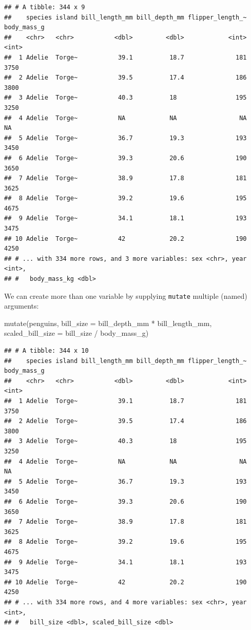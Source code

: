 \documentclass[
]{book}
\newenvironment{Shaded}{\begin{snugshade}}{\end{snugshade}}
\newcommand{\AttributeTok}[1]{\textcolor[rgb]{0.77,0.63,0.00}{#1}}
\newcommand{\FunctionTok}[1]{\textcolor[rgb]{0.00,0.00,0.00}{#1}}
\newcommand{\NormalTok}[1]{#1}
\newcommand{\SpecialCharTok}[1]{\textcolor[rgb]{0.00,0.00,0.00}{#1}}
\begin{document}
\begin{verbatim}
## # A tibble: 344 x 9
##    species island bill_length_mm bill_depth_mm flipper_length_~ body_mass_g
##    <chr>   <chr>           <dbl>         <dbl>            <int>       <int>
##  1 Adelie  Torge~           39.1          18.7              181        3750
##  2 Adelie  Torge~           39.5          17.4              186        3800
##  3 Adelie  Torge~           40.3          18                195        3250
##  4 Adelie  Torge~           NA            NA                 NA          NA
##  5 Adelie  Torge~           36.7          19.3              193        3450
##  6 Adelie  Torge~           39.3          20.6              190        3650
##  7 Adelie  Torge~           38.9          17.8              181        3625
##  8 Adelie  Torge~           39.2          19.6              195        4675
##  9 Adelie  Torge~           34.1          18.1              193        3475
## 10 Adelie  Torge~           42            20.2              190        4250
## # ... with 334 more rows, and 3 more variables: sex <chr>, year <int>,
## #   body_mass_kg <dbl>
\end{verbatim}

We can create more than one variable by supplying \texttt{mutate} multiple (named) arguments:

\begin{Shaded}
\begin{Highlighting}[]
\FunctionTok{mutate}\NormalTok{(penguins, }
       \AttributeTok{bill\_size =}\NormalTok{ bill\_depth\_mm }\SpecialCharTok{*}\NormalTok{ bill\_length\_mm,}
       \AttributeTok{scaled\_bill\_size =}\NormalTok{ bill\_size }\SpecialCharTok{/}\NormalTok{ body\_mass\_g)}
\end{Highlighting}
\end{Shaded}

\begin{verbatim}
## # A tibble: 344 x 10
##    species island bill_length_mm bill_depth_mm flipper_length_~ body_mass_g
##    <chr>   <chr>           <dbl>         <dbl>            <int>       <int>
##  1 Adelie  Torge~           39.1          18.7              181        3750
##  2 Adelie  Torge~           39.5          17.4              186        3800
##  3 Adelie  Torge~           40.3          18                195        3250
##  4 Adelie  Torge~           NA            NA                 NA          NA
##  5 Adelie  Torge~           36.7          19.3              193        3450
##  6 Adelie  Torge~           39.3          20.6              190        3650
##  7 Adelie  Torge~           38.9          17.8              181        3625
##  8 Adelie  Torge~           39.2          19.6              195        4675
##  9 Adelie  Torge~           34.1          18.1              193        3475
## 10 Adelie  Torge~           42            20.2              190        4250
## # ... with 334 more rows, and 4 more variables: sex <chr>, year <int>,
## #   bill_size <dbl>, scaled_bill_size <dbl>
\end{verbatim}
\end{document}

